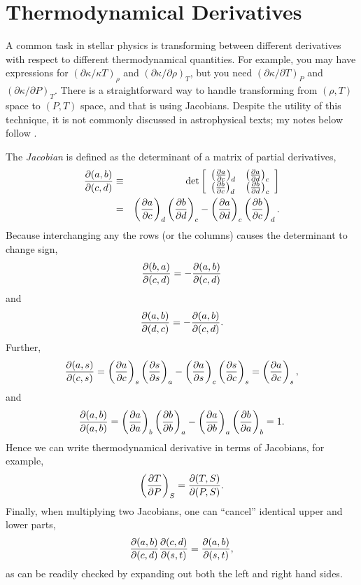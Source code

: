 \chapter{Thermodynamical Derivatives}
\label{s.thermo-derivatives}

A common task in stellar physics is transforming between different derivatives with respect to different thermodynamical quantities.  For example, you may have expressions for $(\partial \kappa/\kappa T)_{\rho}$ and $(\partial \kappa/\partial \rho)_{T}$, but you need $(\partial\kappa/\partial T)_{P}$ and $(\partial\kappa/\partial P)_{T}$.  There is a straightforward way to handle transforming from $(\rho,T)$ space to $(P,T)$ space, and that is using Jacobians.  Despite the utility of this technique, it is not commonly discussed in astrophysical texts; my notes below follow \citet{landau80:_statis_physic}.

The \emph{Jacobian} is defined as the determinant of a matrix of partial derivatives,
\begin{eqnarray}
\frac{\partial(a,b)}{\partial(c,d)} &\equiv& \det\left[
	\begin{array}{lr}\left(\frac{\partial a}{\partial c}\right)_{d} & \left(\frac{\partial a}{\partial d}\right)_{c}\\
	\left(\frac{\partial b}{\partial c}\right)_{d} & \left(\frac{\partial b}{\partial d}\right)_{c} \end{array}\right] \nonumber \\
 & = & \left(\frac{\partial a}{\partial c}\right)_{d}\left(\frac{\partial b}{\partial d}\right)_{c} - \left(\frac{\partial a}{\partial d}\right)_{c}\left(\frac{\partial b}{\partial c}\right)_{d}.
 \end{eqnarray}
Because interchanging any the rows (or the columns) causes the determinant to change sign, 
\begin{equation}
\frac{\partial(b,a)}{\partial(c,d)} = -\frac{\partial(a,b)}{\partial(c,d)}
\end{equation}
and
\begin{equation}
\frac{\partial(a,b)}{\partial(d,c)} = -\frac{\partial(a,b)}{\partial(c,d)}.
\end{equation}
Further,
\begin{equation}
\frac{\partial(a,s)}{\partial(c,s)} = \left(\frac{\partial a}{\partial c}\right)_{s}\left(\frac{\partial s}{\partial s}\right)_{a} - \left(\frac{\partial a}{\partial s}\right)_{c}\left(\frac{\partial s}{\partial c}\right)_{s} = \left(\frac{\partial a}{\partial c}\right)_{s},
\end{equation}
and
\begin{equation}
\frac{\partial(a,b)}{\partial(a,b)} = \left(\frac{\partial a}{\partial a}\right)_{b}\left(\frac{\partial b}{\partial b}\right)_{a} - \left(\frac{\partial a}{\partial b}\right)_{a}\left(\frac{\partial b}{\partial a}\right)_{b} = 1.
\end{equation}
Hence we can write thermodynamical derivative in terms of Jacobians, for example,
\begin{equation}
\left(\frac{\partial T}{\partial P}\right)_{S} = \frac{\partial(T,S)}{\partial(P,S)}.
\end{equation}
Finally, when multiplying two Jacobians, one can ``cancel'' identical upper and lower parts,
\begin{equation}
\frac{\partial(a,b)}{\partial(c,d)}\frac{\partial(c,d)}{\partial(s,t)} =\frac{\partial(a,b)}{\partial(s,t)},
\end{equation}
as can be readily checked by expanding out both the left and right hand sides.

